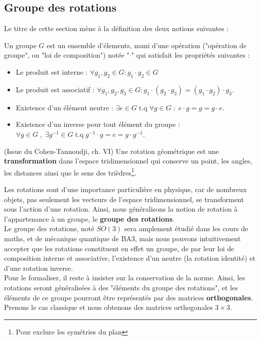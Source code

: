 \documentclass[../notesdecours.tex]{subfiles}
\begin{document}
\subsection{Groupe des rotations}

Le titre de cette section mène à la définition des deux notions suivantes :
\begin{definition}
    Un groupe $G$ est un ensemble d'élements, muni d'une opération ("opération de groupe", ou "loi de composition") notée "$\cdot$" qui satisfait les propriétés suivantes :
    \begin{itemize}
        \item Le produit est interne : $\forall g_1, g_2 \in G : g_1\cdot g_2 \in G$
        \item Le produit est associatif : $\forall g_1, g_2, g_3 \in G : g_1\cdot(g_2\cdot g_3) = (g_1\cdot g_2)\cdot g_3.$
        \item Existence d'un élément neutre : $\exists e\in G \; \text{t.q} \; \forall g \in G \; : \; e\cdot g = g = g\cdot e$.
        \item Existence d'un inverse pour tout élément du groupe : $\forall g \in G\; ,\; \exists g^{-1}\in G \; \text{t.q} \; g^{-1}\cdot g = e = g\cdot g^{-1}.$
    \end{itemize}
\end{definition}
\begin{definition}(Issue du Cohen-Tannoudji, ch. VI)
    Une rotation géométrique est une \textbf{transformation} dans l'espace tridimensionnel qui conserve un point, les angles, les distances ainsi que le sens des trièdres\footnote{Pour exclure les symétries du plan}.
\end{definition}


Les rotations sont d'une importance particulière en physique, car de nombreux objets, pas seulement les vecteurs de l'espace tridimensionnel, se transforment sous l'action d'une rotation. Ainsi, nous généralisons la notion de rotation à l'appartenance à un groupe, le \textbf{groupe des rotations}. \\

Le groupe des rotations, noté $SO(3)$ sera amplement étudié dans les cours de maths, et de mécanique quantique de BA3, mais nous pouvons intuitivement accepter que les rotations constituent en effet un groupe, de par leur loi de composition interne et associative, l'existence d'un neutre (la rotation identité) et d'une rotation inverse. \\

Pour le formaliser, il reste à insister sur la conservation de la norme. Ainsi, les rotations seront généralisées à des "éléments du groupe des rotations", et les éléments de ce groupe pourront être représentés par des matrices \textbf{orthogonales}. Prenons le cas classique et nous obtenons des matrices orthogonales $3\times 3$.
\end{document}
